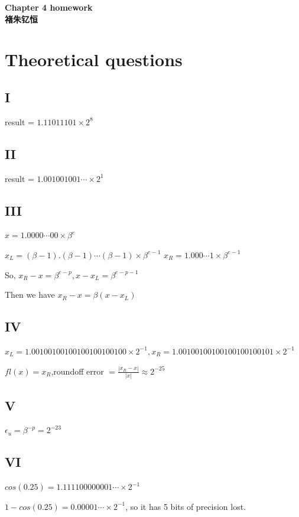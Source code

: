 \documentclass[12]{article}%
\begin{document}
\begin{center}
    \LARGE\songti\textbf{Chapter 4 homework} \\%
    \large\kaishu\textbf{褚朱钇恒}%
\end{center}
    \section{Theoretical questions}
        \subsection{I}
        result = $1.11011101\times2^8$

        \subsection{II}
        result = $1.001001001\cdots\times2^1$

        \subsection{III}
        $x=1.0000\cdots00\times \beta^e$

        $x_L=(\beta-1).(\beta-1)\cdots(\beta-1)\times \beta^{e-1}$
        $x_R=1.000\cdots1\times \beta^{e-1}$

        So, $x_R-x=\beta^{e-p},x-x_L=\beta^{e-p-1}$

        Then we have $x_R-x=\beta(x-x_L)$
        
        \subsection{IV}
        $x_L=1.00100100100100100100100\times2^{-1},x_R=1.00100100100100100100101\times 2^{-1}$

        $fl(x)=x_R$,roundoff error $=\frac{|x_R-x|}{|x|}\approx2^{-25}$
        
        \subsection{V}
        $\epsilon_u=\beta^{-p}=2^{-23}$

        \subsection{VI}
            $cos(0.25)=1.111100000001\cdots\times 2^{-1}$

            $1-cos(0.25)=0.00001\cdots\times 2^{-1}$, so it has 5 bits of precision lost.
\end{document}
